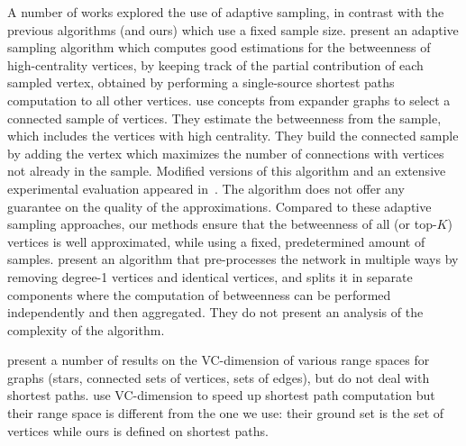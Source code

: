 A number of works explored
the use of adaptive sampling, in contrast with the previous algorithms (and
ours) which use a fixed sample size. \citet{BaderKMM07} present an adaptive
sampling algorithm which computes good estimations for the betweenness of
high-centrality vertices, by keeping track of the partial contribution of each
sampled vertex, obtained by performing a single-source shortest paths
computation to all other vertices. \citet{MaiyaBW10} use concepts from expander
graphs to select a connected sample of vertices. They estimate the betweenness
from the sample, which includes the vertices with high centrality. They build
the connected sample by adding the vertex which maximizes the number of
connections with vertices not already in the sample. Modified versions
of this algorithm and an extensive experimental evaluation appeared
in~\citep{LimMRTB11}. The algorithm does not offer any guarantee on the quality
of the approximations. Compared to these adaptive sampling approaches, our
methods ensure that the betweenness of all (or top-$K$) vertices is well
approximated, while using a fixed, predetermined amount of samples.
\citet{SaryuceSKC13} present an algorithm that pre-processes the network in
multiple ways by removing degree-1 vertices and identical vertices, and splits it
in separate components where the computation of betweenness can be performed
independently and then aggregated. They do not present an analysis of the
complexity of the algorithm. 

\citet{KranakisKRUW97} present a number of results on the VC-dimension of
various range spaces for graphs (stars, connected sets of vertices, sets of
edges), but do not deal with shortest paths. \citet{AbrahamDFGW11} use
VC-dimension to speed up shortest path computation but their range space is
different from the one we use: their ground set is the set of vertices while
ours is defined on shortest paths.


